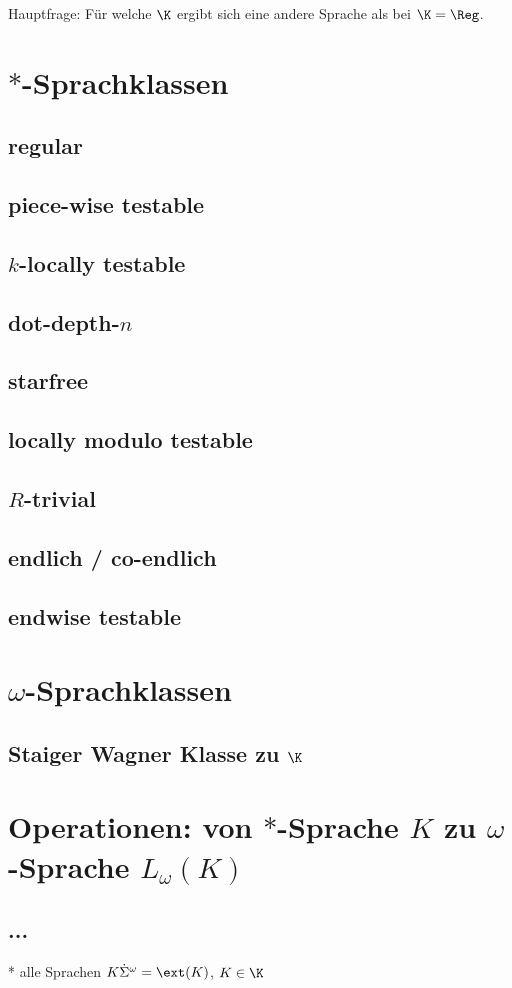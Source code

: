 

Hauptfrage: Für welche $\K$ ergibt sich eine andere Sprache als bei $\K = \Reg$.

\section{$*$-Sprachklassen}
\subsection{regular}
\subsection{piece-wise testable}
\subsection{$k$-locally testable}
\subsection{dot-depth-$n$}
\subsection{starfree}
\subsection{locally modulo testable}
\subsection{$R$-trivial}
\subsection{endlich / co-endlich}
\subsection{endwise testable}

\section{$\omega$-Sprachklassen}
\subsection{Staiger Wagner Klasse zu $\K$}

\section{Operationen: von $*$-Sprache $K$ zu $\omega$-Sprache $L_\omega (K)$}
\subsection{...}

* alle Sprachen $K \dot \Sigma^\omega = \ext(K)$, $K \in \K$

